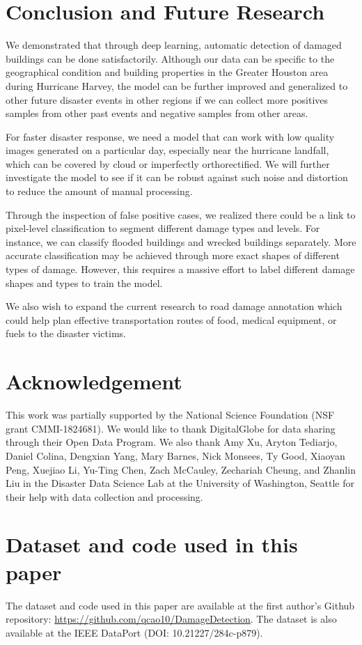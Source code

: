 \documentclass[journal, 12pt, onecolumn,draftclsnofoot]{IEEEtran}
\begin{document}
\section{Conclusion and Future Research}\label{sec:conclusion}
We demonstrated that through deep learning, automatic detection of damaged buildings can be done satisfactorily. Although our data can be specific to the geographical condition and building properties in the Greater Houston area during Hurricane Harvey, the model can be further improved and generalized to other future disaster events in other regions if we can collect more positives samples from other past events and negative samples from other areas. 

For faster disaster response, we need a model that can work with low quality images generated on a particular day, especially near the hurricane landfall, which can be covered by cloud or imperfectly orthorectified. We will further investigate the model to see if it can be robust against such noise and distortion to reduce the amount of manual processing.


Through the inspection of false positive cases, we realized there could be a link to pixel-level classification to segment different damage types and levels. For instance, we can classify flooded buildings and wrecked buildings separately. More accurate classification may be achieved through more exact shapes of different types of damage. However, this requires a massive effort to label different damage shapes and types to train the model. 

We also wish to expand the current research to road damage annotation which could help plan effective transportation routes of food, medical equipment, or fuels to the disaster victims. 


\section*{Acknowledgement}
This work was partially supported by the National Science Foundation (NSF grant CMMI-1824681). We would like to thank DigitalGlobe for data sharing through their Open Data Program. We also thank Amy Xu, Aryton Tediarjo, Daniel Colina, Dengxian Yang, Mary Barnes, Nick Monsees, Ty Good, Xiaoyan Peng, Xuejiao Li, Yu-Ting Chen, Zach McCauley, Zechariah Cheung, and Zhanlin Liu in the Disaster Data Science Lab at the University of Washington, Seattle for their help with data collection and processing. 
\appendices
\section{Dataset and code used in this paper}
The dataset and code used in this paper are available at the first author's Github repository: \url{https://github.com/qcao10/DamageDetection}. The dataset is also available at the IEEE DataPort (DOI: 10.21227/284c-p879).\\
\end{document}
